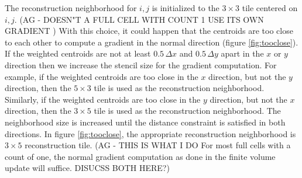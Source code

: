 \begin{enumerate}
\begin{figure}
    \label{fig:centroids}
\end{figure}
The reconstruction neighborhood for $i,j$ is initialized to the $3 \times 3$ tile
centered on $i,j$. (AG - DOESN"T A FULL CELL WITH COUNT 1 USE ITS OWN GRADIENT )
With this choice, it could happen that the centroids are too close to each 
other to compute a gradient in the normal direction (figure \ref{fig:tooclose}). 
If the weighted centroids are not at least $0.5\,\Delta x$  and $0.5\,\Delta y$ 
apart in the $x$ or $y$ direction then we increase the stencil size for the 
gradient computation.  For example, if the weighted centroids are too close in the $x$ 
direction, but not the $y$ direction, then the $5\times 3$ tile is used as the 
reconstruction neighborhood.  Similarly, if the weighted centroids are too 
close in the $y$ direction, but not the $x$ direction, then the $3\times 5$ tile is 
used as the reconstruction neighborhood.  The neighborhood size is increased until the 
distance constraint is satisfied in both directions.  In figure \ref{fig:tooclose},
the appropriate reconstruction neighborhood is $3\times 5$ reconstruction tile.
(AG - THIS IS WHAT I DO For most full cells with a count of one,
the normal gradient computation as done in the finite volume update will suffice.
DISUCSS BOTH HERE?)
\begin{figure}
    \centering
     \hfill

\end{figure}
\end{enumerate}
